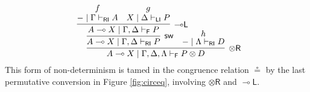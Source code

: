 \documentclass[copyright,creativecommons]{eptcs}
\theoremstyle{definition}
\newcommand{\tr}{\otimes \mathsf{R}}
\newcommand{\lleft}{{\multimap}\mathsf{L}}
\newcommand{\ot}{\otimes}
\newcommand{\lolli}{\multimap}
\newcommand{\RI}{\mathsf{RI}}
\newcommand{\LI}{\mathsf{LI}}
\newcommand{\F}{\mathsf{F}}
\newcommand{\proofbox}[1]{\begin{tabular}{l} #1 \end{tabular}}
\begin{document}
\begin{enumerate}
\begin{equation}
{{{{          }
        }
      }
      \hspace{.2cm}
      \infer[\tr]{A \lolli X \mid \Gamma , \Delta , \Lambda \vdash_{\F} P \ot D}{
        \infer[\mathsf{sw}]{A \lolli X \mid \Gamma , \Delta \vdash_{\RI} P}{
          \infer[\lleft]{A \lolli X \mid \Gamma , \Delta \vdash_{\F} P}{
            \deduce{{-} \mid \Gamma \vdash_{\RI} A}{f}
            &
            \deduce{X \mid \Delta \vdash_{\LI} P}{g}
          }
        }
        &\hspace{-.6cm}
        \deduce{{-} \mid \Lambda \vdash_{\RI} D}{h}
      }
    }
    \end{equation}
    This form of non-determinism is tamed in the congruence relation $\circeq$ by the last permutative conversion in Figure \ref{fig:circeq}, involving $\tr$ and $\lleft$.
\end{enumerate}

\end{document}
